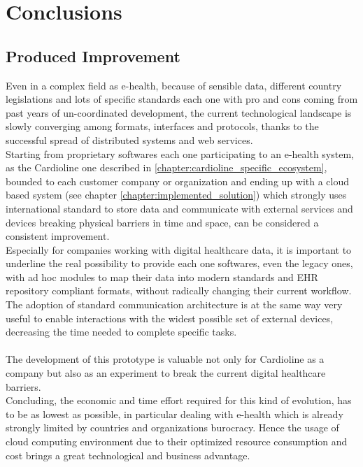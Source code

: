 \chapter{Conclusions}
\section{Produced Improvement}
Even in a complex field as e-health, because of sensible data, different country legislations and lots of specific standards each one with pro and cons coming from past years of un-coordinated development, the current technological landscape is slowly converging among formats, interfaces and protocols, thanks to the successful spread of distributed systems and web services.\\
Starting from proprietary softwares each one participating to an e-health system, as the Cardioline one described in \ref{chapter:cardioline_specific_ecosystem}, bounded to each customer company or organization and ending up with a cloud based system (see chapter \ref{chapter:implemented_solution}) which strongly uses international standard to store data and communicate with external services and devices breaking physical barriers in time and space, can be considered a consistent improvement.\\
Especially for companies working with digital healthcare data, it is important to underline the real possibility to provide each one softwares, even the legacy ones, with ad hoc modules to map their data into modern standards and EHR repository compliant formats, without radically changing their current workflow.
The adoption of standard communication architecture is at the same way very useful to enable interactions with the widest possible set of external devices, decreasing the time needed to complete specific tasks.\\ \\
The development of this prototype is valuable not only for Cardioline as a company but also as an experiment to break the current digital healthcare barriers.\\
Concluding, the economic and time effort required for this kind of evolution, has to be as lowest as possible, in particular dealing with e-health which is already strongly limited by countries and organizations burocracy. Hence the usage of cloud computing environment due to their optimized resource consumption and cost brings a great technological and business advantage.

